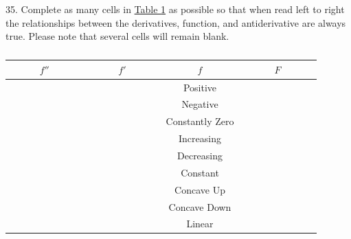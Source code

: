 \documentclass[12pt,]{book}
\theoremstyle{plain}
\theoremstyle{definition}
\numberwithin{equation}{section}
\newcounter{figstack}
\newlength\fight
\newcommand\pushValignCaptionBottom[5][b]{%
\stepcounter{figstack}%
\expandafter\def\csname %
figalign\romannumeral\value{figstack}\endcsname{#1}%
\expandafter\def\csname %
figtype\romannumeral\value{figstack}\endcsname{#2}%
\expandafter\def\csname %
figwd\romannumeral\value{figstack}\endcsname{#3}%
\expandafter\def\csname %
figcontent\romannumeral\value{figstack}\endcsname{#4}%
\expandafter\def\csname %
figcap\romannumeral\value{figstack}\endcsname{#5}%
\setbox0=\hbox{%
\begin{#2}{#3}#4\end{#2}}%
\ifdim\dimexpr\ht0+\dp0\relax>\fight\global\setlength{\fight}{%
\dimexpr\ht0+\dp0\relax}\fi%
}
\newcommand{\fd}[1]{#1'}
\newcommand{\sd}[1]{#1''}
\begin{document}
\par\smallskip\noindent
\begin{exerciselist}
\item[35.]\hypertarget{exercise-332}{\null}Complete as many cells in \hyperref[table-derivative-relations]{Table \ref{table-derivative-relations}} as possible so that when read left to right the relationships between the derivatives, function, and antiderivative are always true. Please note that several cells will remain blank.%
\begin{table}
\centering
\caption{\label{table-derivative-relations}}
\begin{tabular}{c|c|c|c}
\toprule
\(\sd{f}\)&\(\fd{f}\)&\(f\)&\(F\)\\
\midrule
\(\phantom{\text{Constantly Zero}}\)&\(\phantom{\text{Constantly Zero}}\)&Positive&\(\phantom{\text{Constantly Zero}}\)\\
\midrule
&&Negative&\\
\midrule
&&Constantly Zero&\\
\midrule
&&Increasing&\\
\midrule
&&Decreasing&\\
\midrule
&&Constant&\\
\midrule
&&Concave Up&\\
\midrule
&&Concave Down&\\
\midrule
&&Linear&\\
\bottomrule
\end{tabular}
\end{table}
\par\smallskip
\hypertarget{exercisegroup-69}{\null}
\end{exerciselist}
\end{document}
